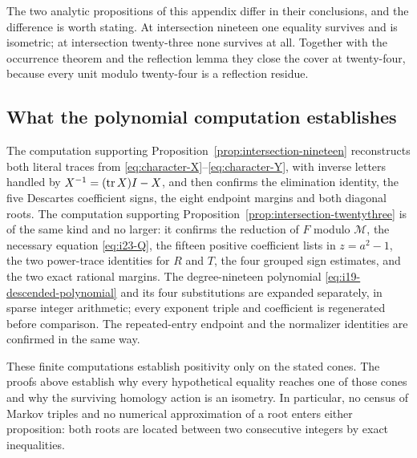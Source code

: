 The two analytic propositions of this appendix differ in their
conclusions, and the difference is worth stating. At intersection
nineteen one equality survives and is isometric; at intersection
twenty-three none survives at all. Together with the occurrence theorem
and the reflection lemma they close the cover at twenty-four, because
every unit modulo twenty-four is a reflection residue.

\subsection{What the polynomial computation establishes}

The computation supporting Proposition~\ref{prop:intersection-nineteen} reconstructs both literal traces from \eqref{eq:character-X}--\eqref{eq:character-Y}, with inverse letters handled by $X^{-1}=(\operatorname{tr} X)I-X$, and then confirms the elimination identity, the five Descartes coefficient signs, the eight endpoint margins and both diagonal roots. The computation supporting Proposition~\ref{prop:intersection-twentythree} is of the same kind and no larger: it confirms the reduction of $F$ modulo $\mathcal M$, the necessary equation \eqref{eq:i23-Q}, the fifteen positive coefficient lists in $z=a^2-1$, the two power-trace identities for $R$ and $T$, the four grouped sign estimates, and the two exact rational margins. The degree-nineteen polynomial \eqref{eq:i19-descended-polynomial} and its four substitutions are expanded separately, in sparse integer arithmetic; every exponent triple and coefficient is regenerated before comparison. The repeated-entry endpoint and the normalizer identities are confirmed in the same way.

These finite computations establish positivity only on the stated cones. The proofs above establish why every hypothetical equality reaches one of those cones and why the surviving homology action is an isometry. In particular, no census of Markov triples and no numerical approximation of a root enters either proposition: both roots are located between two consecutive integers by exact inequalities.
